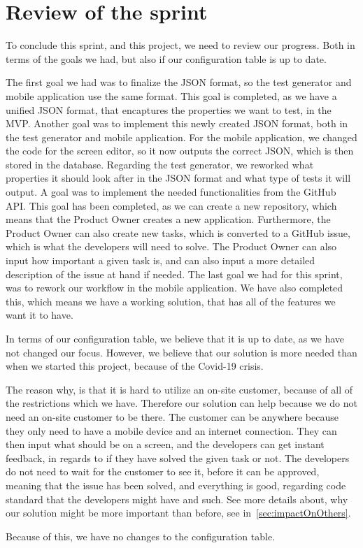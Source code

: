 \section{Review of the sprint}
To conclude this sprint, and this project, we need to review our progress.
Both in terms of the goals we had, but also if our configuration table is up to date.

The first goal we had was to finalize the JSON format, so the test generator and mobile application use the same format.
This goal is completed, as we have a unified JSON format, that encaptures the properties we want to test, in the MVP.
Another goal was to implement this newly created JSON format, both in the test generator and mobile application.
For the mobile application, we changed the code for the screen editor, so it now outputs the correct JSON, which is then stored in the database.
Regarding the test generator, we reworked what properties it should look after in the JSON format and what type of tests it will output.
A goal was to implement the needed functionalities from the GitHub API.
This goal has been completed, as we can create a new repository, which means that the Product Owner creates a new application.
Furthermore, the Product Owner can also create new tasks, which is converted to a GitHub issue, which is what the developers will need to solve.
The Product Owner can also input how important a given task is, and can also input a more detailed description of the issue at hand if needed.
The last goal we had for this sprint, was to rework our workflow in the mobile application.
We have also completed this, which means we have a working solution, that has all of the features we want it to have.

In terms of our configuration table, we believe that it is up to date, as we have not changed our focus.
However, we believe that our solution is more needed than when we started this project, because of the Covid-19 crisis.

The reason why, is that it is hard to utilize an on-site customer, because of all of the restrictions which we have.
Therefore our solution can help because we do not need an on-site customer to be there.
The customer can be anywhere because they only need to have a mobile device and an internet connection.
They can then input what should be on a screen, and the developers can get instant feedback, in regards to if they have solved the given task or not.
The developers do not need to wait for the customer to see it, before it can be approved, meaning that the issue has been solved, and everything is good, regarding code standard that the developers might have and such.
See more details about, why our solution might be more important than before, see in~\autoref{sec:impactOnOthers}.

Because of this, we have no changes to the configuration table.